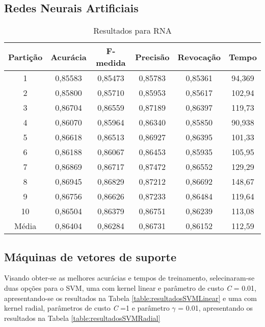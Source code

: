 \subsection{Redes Neurais Artificiais}
\begin{table}[h]
\centering
\caption{Resultados para RNA}
\vspace{0.2cm}
\begin{tabular}{c|c|c|c|c|c}
Partição & Acurácia & F-medida & Precisão & Revocação & Tempo \\
\hline
1  & 0,85583 & 0,85473 & 0,85783 & 0,85361 & 94,369 \\
2  & 0,85800 & 0,85710 & 0,85953 & 0,85617 & 102,94 \\
3  & 0,86704 & 0,86559 & 0,87189 & 0,86397 & 119,73 \\
4  & 0,86070 & 0,85964 & 0,86340 & 0,85850 & 90,938 \\
5  & 0,86618 & 0,86513 & 0,86927 & 0,86395 & 101,33 \\
6  & 0,86188 & 0,86067 & 0,86453 & 0,85935 & 105,95 \\
7  & 0,86869 & 0,86717 & 0,87472 & 0,86552 & 129,29 \\
8  & 0,86945 & 0,86829 & 0,87212 & 0,86692 & 148,67 \\
9  & 0,86756 & 0,86626 & 0,87233 & 0,86484 & 119,64 \\
10 & 0,86504 & 0,86379 & 0,86751 & 0,86239 & 113,08 \\
\hline
Média & 0,86404 & 0,86284 & 0,86731 & 0,86152 & 112,59 \\
\end{tabular} 
\label{table:resultadosRNA}
\end{table}

\subsection{Máquinas de vetores de suporte}

Visando obter-se as melhores acurácias e tempos de treinamento, selecinaram-se duas opções para o SVM, uma com kernel linear e parâmetro de custo \emph{C} = 0.01, apresentando-se os resultados na Tabela \ref{table:resultadosSVMLinear} e uma com kernel radial, parâmetros de custo \emph{C} =1 e parâmetro \(\gamma\) = 0.01, apresentando os resultados na Tabela \ref{table:resultadosSVMRadial}

